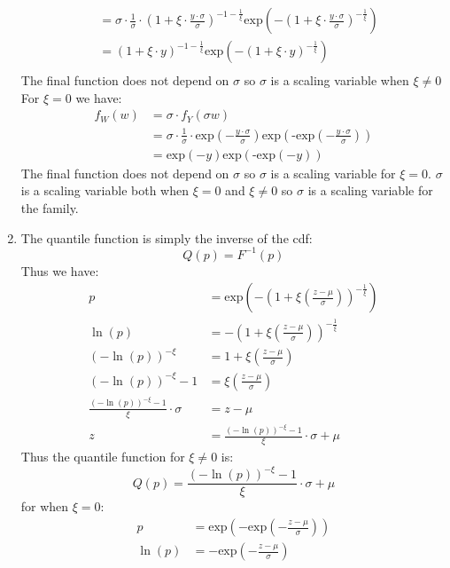 \documentclass{article}
\begin{document}
\begin{enumerate}
\begin{align*}
&= \sigma \cdot \frac{1}{\sigma} \cdot (1 + \xi \cdot \frac{y \cdot \sigma}{\sigma})^{-1 - \frac{1}{\xi}}\mbox{exp}(-(1 + \xi \cdot \frac{y \cdot \sigma}{\sigma})^{-\frac{1}{\xi}}) \\
&= (1 + \xi \cdot y)^{-1 - \frac{1}{\xi}}\mbox{exp}(-(1 + \xi \cdot y)^{-\frac{1}{\xi}}) \\
\end{align*}
The final function does not depend on $\sigma$ so $\sigma$ is a scaling variable when $\xi \neq 0$ \\
For $\xi = 0$ we have: \\
\begin{align*}
f_W(w) &= \sigma \cdot f_Y(\sigma w) \\
&= \sigma \cdot \frac{1}{\sigma} \cdot \mbox{exp}(-\frac{y \cdot \sigma}{\sigma})\mbox{exp}(\mbox{-exp}(-\frac{y \cdot \sigma}{\sigma})) \\
&= \mbox{exp}(-y)\mbox{exp}(\mbox{-exp}(-y))
\end{align*}
The final function does not depend on $\sigma$ so $\sigma$ is a scaling variable for $\xi = 0$. $\sigma$ is a scaling variable both when $\xi = 0$ and $\xi \neq 0$ so $\sigma$ is a scaling variable for the family. \\
\item The quantile function is simply the inverse of the cdf: \\
\[
Q(p) = F^{-1}(p)
\]
Thus we have: \\
\begin{align*}
p &= \mbox{exp}(-(1 + \xi(\frac{z - \mu}{\sigma}))^{-\frac{1}{\xi}}) \\
\ln(p) &= -(1 + \xi(\frac{z - \mu}{\sigma}))^{-\frac{1}{\xi}} \\
(-\ln(p))^{-\xi} &= 1 + \xi(\frac{z - \mu}{\sigma}) \\
(-\ln(p))^{-\xi} - 1 &= \xi(\frac{z - \mu}{\sigma}) \\
\frac{(-\ln(p))^{-\xi} - 1}{\xi} \cdot \sigma &= z - \mu \\
z &= \frac{(-\ln(p))^{-\xi} - 1}{\xi} \cdot \sigma + \mu
\end{align*}
Thus the quantile function for $\xi \neq 0$ is: \\
\[
Q(p) = \frac{(-\ln(p))^{-\xi} - 1}{\xi} \cdot \sigma + \mu
\]
for when $\xi = 0$: \\
\begin{align*}
p &= \mbox{exp}(-\mbox{exp}(-\frac{z - \mu}{\sigma})) \\
\ln(p) &= -\mbox{exp}(-\frac{z - \mu}{\sigma}) \\

\end{align*}
\end{enumerate}
\end{document}
